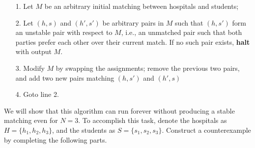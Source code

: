 \documentclass[10pt]{article}
\begin{document}
\begin{itemize}
\item[1.] Let $M$ be an arbitrary initial matching between hospitals and students;

\item[2.] Let $(h, s)$ and $(h', s')$ be arbitrary pairs in $M$ such that $(h, s')$ form an unstable pair with respect to $M$, i.e., an unmatched pair such that both parties prefer each other over their current match. If no such pair exists, \textbf{halt} with output $M$.

\item[3.] Modify $M$ by swapping the assignments; remove the previous two pairs, and add two new pairs matching  $(h, s')$ and $(h', s)$

\item[4.] Goto line 2.
\end{itemize}

We will show that this algorithm can run forever without producing a stable matching even for $N=3$. To accomplish this task,  denote the hospitals as $H = \{ h_1, h_2, h_3 \}$, and the students as $S = \{ s_1, s_2, s_3 \}$. Construct a counterexample by completing the following parts.
\end{document}
